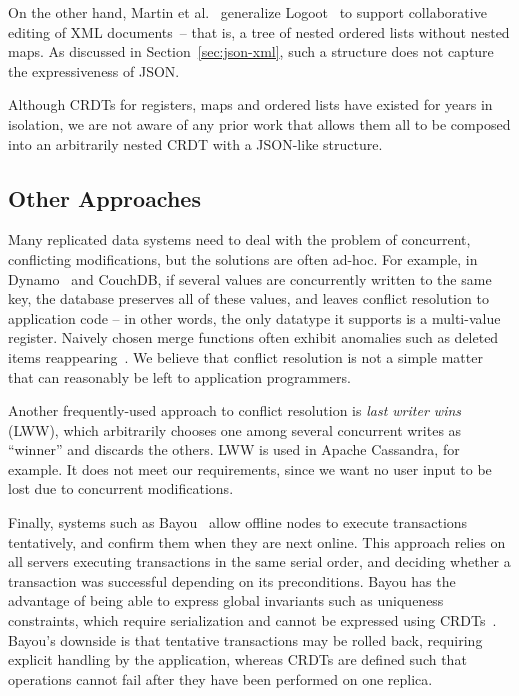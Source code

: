 \documentclass[10pt,journal,compsoc]{IEEEtran}
\begin{document}
On the other hand, Martin et al.~\cite{Martin:2010ih} generalize Logoot~\cite{Weiss:2010hx} to support collaborative editing of XML documents~-- that is, a tree of nested ordered lists without nested maps. As discussed in Section~\ref{sec:json-xml}, such a structure does not capture the expressiveness of JSON.

Although CRDTs for registers, maps and ordered lists have existed for years in isolation, we are not aware of any prior work that allows them all to be composed into an arbitrarily nested CRDT with a JSON-like structure.

\subsection{Other Approaches}\label{sec:related-other}

Many replicated data systems need to deal with the problem of concurrent, conflicting modifications, but the solutions are often ad-hoc. For example, in Dynamo~\cite{DeCandia:2007ui} and CouchDB, if several values are concurrently written to the same key, the database preserves all of these values, and leaves conflict resolution to application code -- in other words, the only datatype it supports is a multi-value register. Naively chosen merge functions often exhibit anomalies such as deleted items reappearing~\cite{DeCandia:2007ui}. We believe that conflict resolution is not a simple matter that can reasonably be left to application programmers.

Another frequently-used approach to conflict resolution is \emph{last writer wins} (LWW), which arbitrarily chooses one among several concurrent writes as ``winner'' and discards the others. LWW is used in Apache Cassandra, for example. It does not meet our requirements, since we want no user input to be lost due to concurrent modifications.

Finally, systems such as Bayou~\cite{Terry:1995dn} allow offline nodes to execute transactions tentatively, and confirm them when they are next online. This approach relies on all servers executing transactions in the same serial order, and deciding whether a transaction was successful depending on its preconditions. Bayou has the advantage of being able to express global invariants such as uniqueness constraints, which require serialization and cannot be expressed using CRDTs~\cite{Bailis:2014th}. Bayou's downside is that tentative transactions may be rolled back, requiring explicit handling by the application, whereas CRDTs are defined such that operations cannot fail after they have been performed on one replica.
\end{document}
